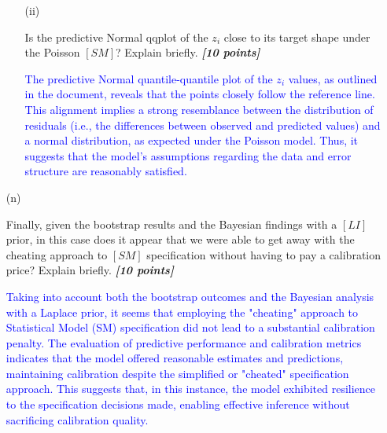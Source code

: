 \documentclass[12pt]{article}
\newcommand{\bi}[1]{\b{\i{#1}}}
\renewcommand{\b}[1]{\textbf{#1}}
\renewcommand{\i}[1]{\textit{#1}}
\begin{document}
\begin{itemize}
\begin{itemize}
\item[(ii)]

Is the predictive Normal qqplot of the $z_i$ close to its target shape under the Poisson $[ SM ]$? Explain briefly. \bi{[10 points]}

\textcolor{blue}{The predictive Normal quantile-quantile plot of the \(z_i\) values, as outlined in the document, reveals that the points closely follow the reference line. This alignment implies a strong resemblance between the distribution of residuals (i.e., the differences between observed and predicted values) and a normal distribution, as expected under the Poisson model. Thus, it suggests that the model's assumptions regarding the data and error structure are reasonably satisfied.}

\end{itemize}

\item[(n)]

Finally, given the bootstrap results and the Bayesian findings with a $[ LI ]$ prior, in this case does it appear that we were able to get away with the cheating approach to $[ SM ]$ specification without having to pay a calibration price? Explain briefly. \bi{[10 points]}

\textcolor{blue}{Taking into account both the bootstrap outcomes and the Bayesian analysis with a Laplace prior, it seems that employing the "cheating" approach to Statistical Model (SM) specification did not lead to a substantial calibration penalty. The evaluation of predictive performance and calibration metrics indicates that the model offered reasonable estimates and predictions, maintaining calibration despite the simplified or "cheated" specification approach. This suggests that, in this instance, the model exhibited resilience to the specification decisions made, enabling effective inference without sacrificing calibration quality.}

\end{itemize}
\end{document}
